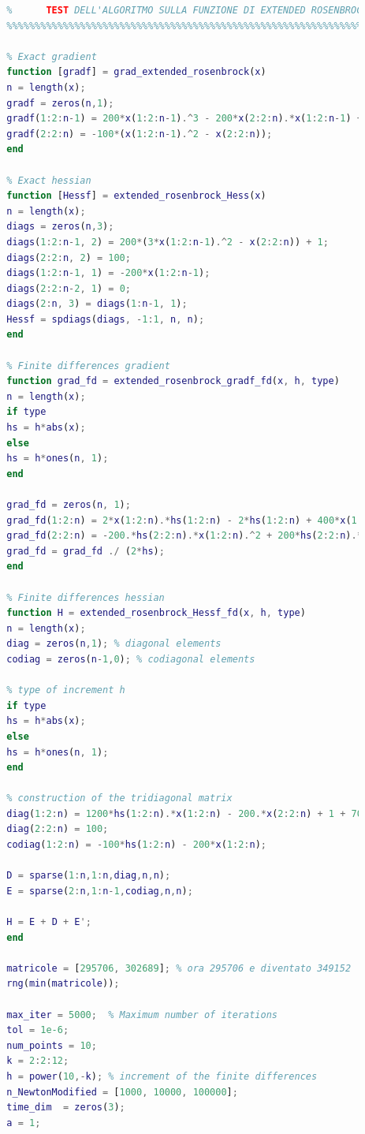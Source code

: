 \documentclass[a4paper,12pt]{article}
\begin{document}
\begin{lstlisting}[language=Matlab,caption={Full script: Modified Newton method on Extended Rosenbrock},label={lst:rosenbrock-extended}]
		%%%%%%%%%%%%%%%%%%%%%%%%%%%%%%%%%%%%%%%%%%%%%%%%%%%%%%%%%%%%%%%%%%%%%
		%      TEST DELL'ALGORITMO SULLA FUNZIONE DI EXTENDED ROSENBROCK
		%%%%%%%%%%%%%%%%%%%%%%%%%%%%%%%%%%%%%%%%%%%%%%%%%%%%%%%%%%%%%%%%%%%%%
		
		% Exact gradient
		function [gradf] = grad_extended_rosenbrock(x)
		n = length(x);
		gradf = zeros(n,1);
		gradf(1:2:n-1) = 200*x(1:2:n-1).^3 - 200*x(2:2:n).*x(1:2:n-1) + x(1:2:n-1) - 1;
		gradf(2:2:n) = -100*(x(1:2:n-1).^2 - x(2:2:n));
		end
		
		% Exact hessian
		function [Hessf] = extended_rosenbrock_Hess(x)
		n = length(x);
		diags = zeros(n,3);
		diags(1:2:n-1, 2) = 200*(3*x(1:2:n-1).^2 - x(2:2:n)) + 1;
		diags(2:2:n, 2) = 100;
		diags(1:2:n-1, 1) = -200*x(1:2:n-1);
		diags(2:2:n-2, 1) = 0;
		diags(2:n, 3) = diags(1:n-1, 1);
		Hessf = spdiags(diags, -1:1, n, n);
		end
		
		% Finite differences gradient
		function grad_fd = extended_rosenbrock_gradf_fd(x, h, type)
		n = length(x);
		if type
		hs = h*abs(x);
		else
		hs = h*ones(n, 1);
		end
		
		grad_fd = zeros(n, 1);
		grad_fd(1:2:n) = 2*x(1:2:n).*hs(1:2:n) - 2*hs(1:2:n) + 400*x(1:2:n).^3.*hs(1:2:n) + 400*x(1:2:n).*hs(1:2:n).^3 - 400*x(1:2:n).*x(2:2:n).*hs(1:2:n);
		grad_fd(2:2:n) = -200.*hs(2:2:n).*x(1:2:n).^2 + 200*hs(2:2:n).*x(2:2:n);
		grad_fd = grad_fd ./ (2*hs);
		end
		
		% Finite differences hessian
		function H = extended_rosenbrock_Hessf_fd(x, h, type)
		n = length(x);
		diag = zeros(n,1); % diagonal elements
		codiag = zeros(n-1,0); % codiagonal elements
		
		% type of increment h
		if type
		hs = h*abs(x);
		else
		hs = h*ones(n, 1);
		end
		
		% construction of the tridiagonal matrix
		diag(1:2:n) = 1200*hs(1:2:n).*x(1:2:n) - 200.*x(2:2:n) + 1 + 700*hs(1:2:n).^2 + 600*x(1:2:n).^2;
		diag(2:2:n) = 100;
		codiag(1:2:n) = -100*hs(1:2:n) - 200*x(1:2:n);
		
		D = sparse(1:n,1:n,diag,n,n);
		E = sparse(2:n,1:n-1,codiag,n,n);
		
		H = E + D + E';
		end
		
		matricole = [295706, 302689]; % ora 295706 e diventato 349152
		rng(min(matricole));
		
		max_iter = 5000;  % Maximum number of iterations
		tol = 1e-6;
		num_points = 10;
		k = 2:2:12; 
		h = power(10,-k); % increment of the finite differences
		n_NewtonModified = [1000, 10000, 100000];
		time_dim  = zeros(3);
		a = 1;
		

\end{lstlisting}
\end{document}
